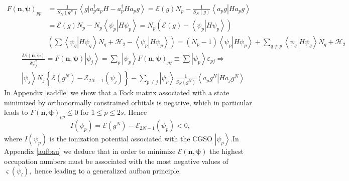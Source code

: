 \documentclass[aps,preprint]{revtex4}%
\begin{document}
\begin{align}
F\left(  \mathbf{n},\mathbf{\psi}\right)  _{pp} &  =\frac{1}{S_{N}\left(
g^{N}\right)  }\left\langle \left.  g\right\vert a_{p}^{\dagger}a_{p}%
H-a_{p}^{\dagger}Ha_{p}g\right\rangle =\mathcal{E}\left(  g\right)
N_{p}-\frac{1}{S_{N}\left(  g\right)  }\left\langle \left.  a_{p}g\right\vert
Ha_{p}g\right\rangle \\
&  =\mathcal{E}\left(  g\right)  N_{p}-N_{p}\left\langle \left.  \psi
_{p}\right\vert H\psi_{p}\right\rangle =N_{p}\left(  \mathcal{E}\left(
g\right)  -\left\langle \left.  \psi_{p}\right\vert H\psi_{p}\right\rangle
\right)  \\
&  \left(  \sum\left\langle \left.  \psi_{q}\right\vert H\psi_{q}\right\rangle
N_{q}+\mathcal{H}_{2}-\left\langle \left.  \psi_{p}\right\vert H\psi
_{p}\right\rangle \right)  =\left(  N_{p}-1\right)  \left\langle \left.
\psi_{p}\right\vert H\psi_{p}\right\rangle +\sum_{q\neq p}\left\langle \left.
\psi_{q}\right\vert H\psi_{q}\right\rangle N_{q}+\mathcal{H}_{2}%
\end{align}%
\begin{align}
&  \frac{\delta\mathcal{E}\left(  \mathbf{n,\psi}\right)  }{\delta\psi
_{j}^{\ast}}=F\left(  \mathbf{n,\psi}\right)  \left\vert \psi_{j}\right\rangle
=\sum_{p}\left\vert \psi_{p}\right\rangle F\left(  \mathbf{n},\mathbf{\psi
}\right)  _{pj}\equiv\sum\left\vert \psi_{p}\right\rangle \varepsilon
_{pj}\Rightarrow\\
&  \left\vert \psi_{j}\right\rangle N_{j}\left\{  \mathcal{E}\left(
g^{N}\right)  -\mathcal{E}_{2N-1}\left(  \psi_{j}\right)  \right\}
-\sum_{p\neq j}\left\vert \psi_{p}\right\rangle \frac{1}{S_{N}\left(
g^{N}\right)  }\left\langle \left.  a_{p}g^{N}\right\vert Ha_{j}%
g^{N}\right\rangle
\end{align}
In Appendix \ref{saddle} we show that a Fock matrix associated with a state
minimized by orthonormally constrained orbitals is negative, which in
particular leads to $F\left(  \mathbf{n},\mathbf{\psi}\right)  _{pp}\leq0$ for
$1\leq p\leq2s$. Hence
\begin{equation}
I\left(  \psi_{p}\right)  =\mathcal{E}\left(  g^{N}\right)  -\mathcal{E}%
_{2N-1}\left(  \psi_{p}\right)  <0,
\end{equation}
where $I\left(  \psi_{p}\right)  $ is the ionization potential associated with
the CGSO $\left\vert \psi_{p}\right\rangle $.In Appendix \ref{aufbau} we
deduce that in order to minimize $\mathcal{E}\left(  \mathbf{n},\mathbf{\psi
}\right)  $ the highest occupation numbers must be associated with the most
negative values of $\varsigma\left(  \psi_{l}\right)  ,$ hence leading to a
generalized aufbau principle.%
\end{document}
